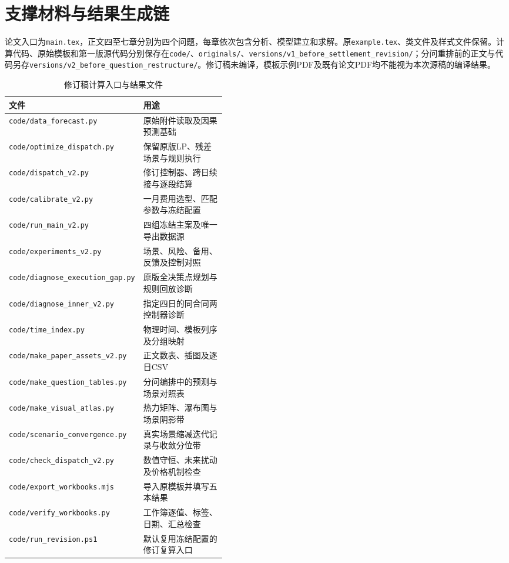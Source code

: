 \section{支撑材料与结果生成链}

论文入口为\texttt{main.tex}，正文四至七章分别为四个问题，每章依次包含分析、模型建立和求解。原\texttt{example.tex}、类文件及样式文件保留。计算代码、原始模板和第一版源代码分别保存在\texttt{code/}、\texttt{originals/}、\texttt{versions/v1\_before\_settlement\_revision/}；分问重排前的正文与代码另存\texttt{versions/v2\_before\_question\_restructure/}。修订稿未编译，模板示例PDF及既有论文PDF均不能视为本次源稿的编译结果。

\begin{table}[htbp]\centering\small
\caption{修订稿计算入口与结果文件}\label{tab:files}
\begin{tabularx}{\linewidth}{p{0.43\linewidth}X}\toprule
文件 & 用途\\\midrule
\texttt{code/data\_forecast.py} & 原始附件读取及因果预测基础\\
\texttt{code/optimize\_dispatch.py} & 保留原版LP、残差场景与规则执行\\
\texttt{code/dispatch\_v2.py} & 修订控制器、跨日续接与逐段结算\\
\texttt{code/calibrate\_v2.py} & 一月费用选型、匹配参数与冻结配置\\
\texttt{code/run\_main\_v2.py} & 四组冻结主案及唯一导出数据源\\
\texttt{code/experiments\_v2.py} & 场景、风险、备用、反馈及控制对照\\
\texttt{code/diagnose\_execution\_gap.py} & 原版全决策点规划与规则回放诊断\\
\texttt{code/diagnose\_inner\_v2.py} & 指定四日的同合同两控制器诊断\\
\texttt{code/time\_index.py} & 物理时间、模板列序及分组映射\\
\texttt{code/make\_paper\_assets\_v2.py} & 正文数表、插图及逐日CSV\\
\texttt{code/make\_question\_tables.py} & 分问编排中的预测与场景对照表\\
\texttt{code/make\_visual\_atlas.py} & 热力矩阵、瀑布图与场景阴影带\\
\texttt{code/scenario\_convergence.py} & 真实场景缩减迭代记录与收敛分位带\\
\texttt{code/check\_dispatch\_v2.py} & 数值守恒、未来扰动及价格机制检查\\
\texttt{code/export\_workbooks.mjs} & 导入原模板并填写五本结果\\
\texttt{code/verify\_workbooks.py} & 工作簿逐值、标签、日期、汇总检查\\
\texttt{code/run\_revision.ps1} & 默认复用冻结配置的修订复算入口\\
\bottomrule\end{tabularx}
\end{table}

